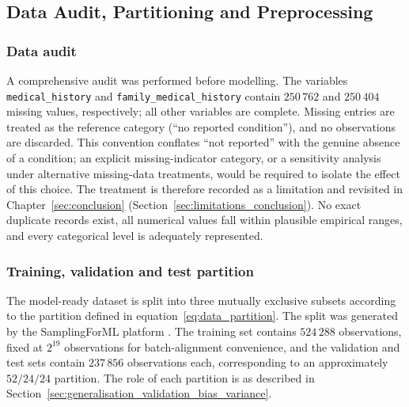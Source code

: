 
\subsection{Data Audit, Partitioning and Preprocessing}
\label{sec:feature_encoding_input_standardisation}


\subsubsection{Data audit}
A comprehensive audit was performed before modelling.  The variables
\texttt{medical\_\allowbreak{}history} and \texttt{family\_medical\_\allowbreak{}history} contain
$250\,762$ and $250\,404$ missing values,
respectively; all other variables are complete.  Missing entries are
treated as the reference category (``no reported condition''), and no
observations are discarded.  This convention conflates ``not reported''
with the genuine absence of a condition; an explicit missing-indicator
category, or a sensitivity analysis under alternative missing-data
treatments, would be required to isolate the effect of this choice.  The
treatment is therefore recorded as a limitation and revisited in
Chapter~\ref{sec:conclusion}
(Section~\ref{sec:limitations_conclusion}).  No exact duplicate records exist, all
numerical values fall within plausible empirical ranges, and every
categorical level is adequately represented.


\subsubsection{Training, validation and test partition}
The model-ready dataset is split into three mutually exclusive subsets
according to the partition defined in equation~\eqref{eq:data_partition}.
The split was generated by the SamplingForML platform \citep{blomerus_samplingforml_2026}.  The training set
contains $524\,288$ observations, fixed at $2^{19}$ observations for
batch-alignment convenience, and the validation and test sets contain
$237\,856$ observations each, corresponding to an approximately
$52/24/24$ partition.  The role of each partition is as described in
Section~\ref{sec:generalisation_validation_bias_variance}.

